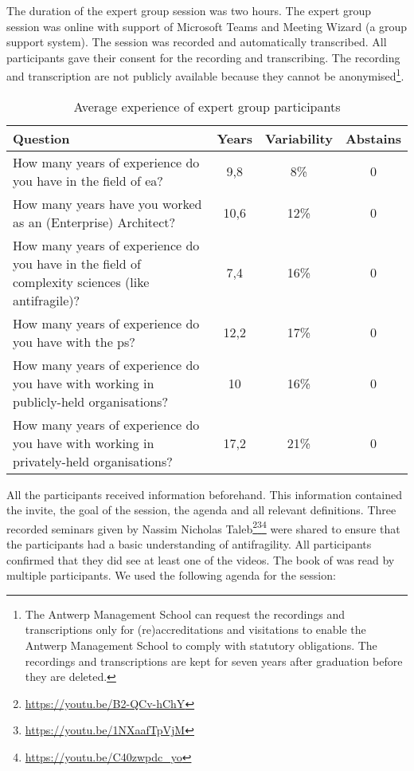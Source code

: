 The duration of the expert group session was two hours. The expert group session was online with support of Microsoft Teams and Meeting Wizard (a group support system). The session was recorded and automatically transcribed. All participants gave their consent for the recording and transcribing. The recording and transcription are not publicly available because they cannot be anonymised\footnote{The Antwerp Management School can request the recordings and transcriptions only for (re)accreditations and visitations to enable the Antwerp Management School to comply with statutory obligations. The recordings and transcriptions are kept for seven years after graduation before they are deleted.}.
\begin{longtable}{@{}p{}ccc@{}}
	\toprule%
	\textbf{Question} & \textbf{Years} & \textbf{Variability} & \textbf{Abstains} \\
	\midrule%
	\endhead%
	\hline
	\endfoot%
	\caption[Average experience of expert group participants]{Average experience of expert group participants}
	\label{tab:experiencevalidationgroup}%
	\endlastfoot%
	How many years of experience do you have in the field of \acrlong{ea}? & 9,8 & 8\% & 0 \\%
	How many years have you worked as an (Enterprise) Architect? & 10,6 & 12\% & 0 \\%
	How many years of experience do you have in the field of complexity sciences (like \gls{antifragile})? & 7,4 & 16\% & 0 \\%
	How many years of experience do you have with the \gls{ps}? & 12,2 & 17\% & 0 \\%
	How many years of experience do you have with working in publicly-held organisations? & 10 & 16\% & 0 \\%
	How many years of experience do you have with working in privately-held organisations? & 17,2 & 21\% & 0 \\%
	\bottomrule%
\end{longtable}
All the participants received information beforehand. This information contained the invite, the goal of the session, the agenda and all relevant definitions. Three recorded seminars given by Nassim Nicholas Taleb\footnote{\url{https://youtu.be/B2-QCv-hChY}}\footnote{\url{https://youtu.be/1NXaafTpVjM}}\footnote{\url{https://youtu.be/C40zwpdc_yo}} were shared to ensure that the participants had a basic understanding of \gls{antifragility}. All participants confirmed that they did see at least one of the videos. The book of \textcite{Taleb2012} was read by multiple participants. We used the following agenda for the session:
